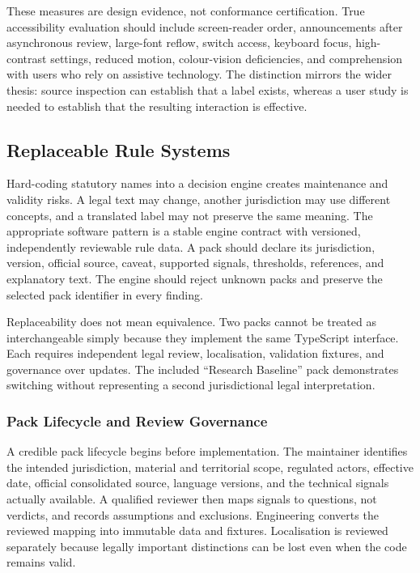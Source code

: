 These measures are design evidence, not conformance certification. True accessibility evaluation should include screen-reader order, announcements after asynchronous review, large-font reflow, switch access, keyboard focus, high-contrast settings, reduced motion, colour-vision deficiencies, and comprehension with users who rely on assistive technology. The distinction mirrors the wider thesis: source inspection can establish that a label exists, whereas a user study is needed to establish that the resulting interaction is effective.

\subsection{Replaceable Rule Systems}

Hard-coding statutory names into a decision engine creates maintenance and validity risks. A legal text may change, another jurisdiction may use different concepts, and a translated label may not preserve the same meaning. The appropriate software pattern is a stable engine contract with versioned, independently reviewable rule data. A pack should declare its jurisdiction, version, official source, caveat, supported signals, thresholds, references, and explanatory text. The engine should reject unknown packs and preserve the selected pack identifier in every finding.

Replaceability does not mean equivalence. Two packs cannot be treated as interchangeable simply because they implement the same TypeScript interface. Each requires independent legal review, localisation, validation fixtures, and governance over updates. The included ``Research Baseline'' pack demonstrates switching without representing a second jurisdictional legal interpretation.

\subsubsection{Pack Lifecycle and Review Governance}

A credible pack lifecycle begins before implementation. The maintainer identifies the intended jurisdiction, material and territorial scope, regulated actors, effective date, official consolidated source, language versions, and the technical signals actually available. A qualified reviewer then maps signals to questions, not verdicts, and records assumptions and exclusions. Engineering converts the reviewed mapping into immutable data and fixtures. Localisation is reviewed separately because legally important distinctions can be lost even when the code remains valid.

